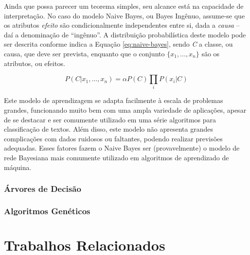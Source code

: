 \documentclass[oneside,openright,12pt]{ufsm_2015} %
\begin{document}
\par Ainda que possa parecer um teorema simples, seu alcance está na capacidade de interpretação. No caso do modelo Naive Bayes, ou Bayes Ingênuo, assume-se que os atributos \textit{efeito} são condicionalmente independentes entre si, dada a \textit{causa} -- daí a denominação de ``ingênuo''. A distribuição probabilística deste modelo pode ser descrita conforme indica a Equação \ref{eq:naive-bayes}, sendo \textit{C} a classe, ou causa, que deve ser prevista, enquanto que o conjunto $\{x_1, ..., x_n\}$ são os atributos, ou efeitos.

\begin{equation} \label{eq:naive-bayes}
P(C | x_1, ..., x_n) = \alpha P(C)\prod_i{P(x_i | C)}
\end{equation}

\par Este modelo de aprendizagem se adapta facilmente à escala de problemas grandes, funcionando muito bem com uma ampla variedade de aplicações, apesar de se destacar e ser comumente utilizado em uma série algoritmos para classificação de textos. Além disso, este modelo não apresenta grandes complicações com dados ruidosos ou faltantes, podendo realizar previsões adequadas. Esses fatores fazem o Naive Bayes ser (provavelmente) o modelo de rede Bayesiana mais comumente utilizado em algoritmos de aprendizado de máquina.

\par 


\subsection{Árvores de Decisão}
\label{sec:arvores-decisao}


\subsection{Algoritmos Genéticos}
\label{sec:alg-geneticos}


\chapter{Trabalhos Relacionados}
\label{sec:trab-relacionados}
\end{document}
